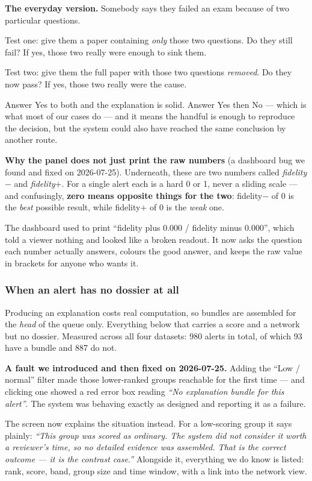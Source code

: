 \documentclass[11pt,a4paper]{article}
\begin{document}
\begin{keybox}
\textbf{The everyday version.} Somebody says they failed an exam because of two
particular questions.

Test one: give them a paper containing \emph{only} those two questions. Do they
still fail? If yes, those two really were enough to sink them.

Test two: give them the full paper with those two questions \emph{removed}. Do
they now pass? If yes, those two really were the cause.

Answer Yes to both and the explanation is solid. Answer Yes then No --- which
is what most of our cases do --- and it means the handful is enough to
reproduce the decision, but the system could also have reached the same
conclusion by another route.
\end{keybox}

\begin{warnbox}
\textbf{Why the panel does not just print the raw numbers} (a dashboard bug we
found and fixed on 2026-07-25). Underneath, these are two numbers called
\emph{fidelity$-$} and \emph{fidelity$+$}. For a single alert each is a hard 0 or
1, never a sliding scale --- and confusingly, \textbf{zero means opposite things
for the two}: fidelity$-$ of 0 is the \emph{best} possible result, while
fidelity$+$ of 0 is the \emph{weak} one.

The dashboard used to print ``fidelity plus 0.000 / fidelity minus 0.000'',
which told a viewer nothing and looked like a broken readout. It now asks the
question each number actually answers, colours the good answer, and keeps the
raw value in brackets for anyone who wants it.
\end{warnbox}

\subsubsection*{When an alert has no dossier at all}

Producing an explanation costs real computation, so bundles are assembled for
the \emph{head} of the queue only. Everything below that carries a score and a
network but no dossier. Measured across all four datasets: 980 alerts in total,
of which 93 have a bundle and 887 do not.

\begin{warnbox}
\textbf{A fault we introduced and then fixed on 2026-07-25.} Adding the
``Low / normal'' filter made those lower-ranked groups reachable for the first
time --- and clicking one showed a red error box reading \emph{``No explanation
bundle for this alert''}. The system was behaving exactly as designed and
reporting it as a failure.

The screen now explains the situation instead. For a low-scoring group it says
plainly: \emph{``This group was scored as ordinary. The system did not consider
it worth a reviewer's time, so no detailed evidence was assembled. That is the
correct outcome --- it is the contrast case.''} Alongside it, everything we do
know is listed: rank, score, band, group size and time window, with a link into
the network view.
\end{warnbox}
\end{document}
